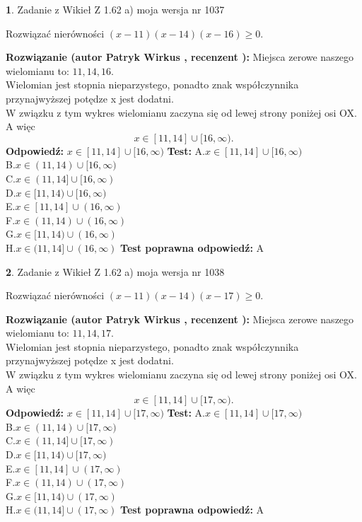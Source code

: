 \documentclass[12pt, a4paper]{article}
\theoremstyle{definition} %
\newtheorem{zad}{}
\newcommand{\zadStart}[1]{\begin{zad}#1\newline}
\newcommand{\zadStop}{\end{zad}}
\newcommand{\rozwStart}[2]{\noindent \textbf{Rozwiązanie (autor #1 , recenzent #2): }\newline}
\newcommand{\rozwStop}{\newline}
\newcommand{\odpStart}{\noindent \textbf{Odpowiedź:}\newline}
\newcommand{\odpStop}{\newline}
\newcommand{\testStart}{\noindent \textbf{Test:}\newline}
\newcommand{\testStop}{\newline}
\newcommand{\kluczStart}{\noindent \textbf{Test poprawna odpowiedź:}\newline}
\newcommand{\kluczStop}{\newline}
\begin{document}
\zadStart{Zadanie z Wikieł Z 1.62 a) moja wersja nr 1037}

Rozwiązać nierówności $(x-11)(x-14)(x-16)\ge0$.
\zadStop
\rozwStart{Patryk Wirkus}{}
Miejsca zerowe naszego wielomianu to: $11, 14, 16$.\\
Wielomian jest stopnia nieparzystego, ponadto znak współczynnika przy\linebreak najwyższej potędze x jest dodatni.\\ W związku z tym wykres wielomianu zaczyna się od lewej strony poniżej osi OX. A więc $$x \in [11,14] \cup [16,\infty).$$
\rozwStop
\odpStart
$x \in [11,14] \cup [16,\infty)$
\odpStop
\testStart
A.$x \in [11,14] \cup [16,\infty)$\\
B.$x \in (11,14) \cup [16,\infty)$\\
C.$x \in (11,14] \cup [16,\infty)$\\
D.$x \in [11,14) \cup [16,\infty)$\\
E.$x \in [11,14] \cup (16,\infty)$\\
F.$x \in (11,14) \cup (16,\infty)$\\
G.$x \in [11,14) \cup (16,\infty)$\\
H.$x \in (11,14] \cup (16,\infty)$
\testStop
\kluczStart
A
\kluczStop



\zadStart{Zadanie z Wikieł Z 1.62 a) moja wersja nr 1038}

Rozwiązać nierówności $(x-11)(x-14)(x-17)\ge0$.
\zadStop
\rozwStart{Patryk Wirkus}{}
Miejsca zerowe naszego wielomianu to: $11, 14, 17$.\\
Wielomian jest stopnia nieparzystego, ponadto znak współczynnika przy\linebreak najwyższej potędze x jest dodatni.\\ W związku z tym wykres wielomianu zaczyna się od lewej strony poniżej osi OX. A więc $$x \in [11,14] \cup [17,\infty).$$
\rozwStop
\odpStart
$x \in [11,14] \cup [17,\infty)$
\odpStop
\testStart
A.$x \in [11,14] \cup [17,\infty)$\\
B.$x \in (11,14) \cup [17,\infty)$\\
C.$x \in (11,14] \cup [17,\infty)$\\
D.$x \in [11,14) \cup [17,\infty)$\\
E.$x \in [11,14] \cup (17,\infty)$\\
F.$x \in (11,14) \cup (17,\infty)$\\
G.$x \in [11,14) \cup (17,\infty)$\\
H.$x \in (11,14] \cup (17,\infty)$
\testStop
\kluczStart
A
\kluczStop
\end{document}
